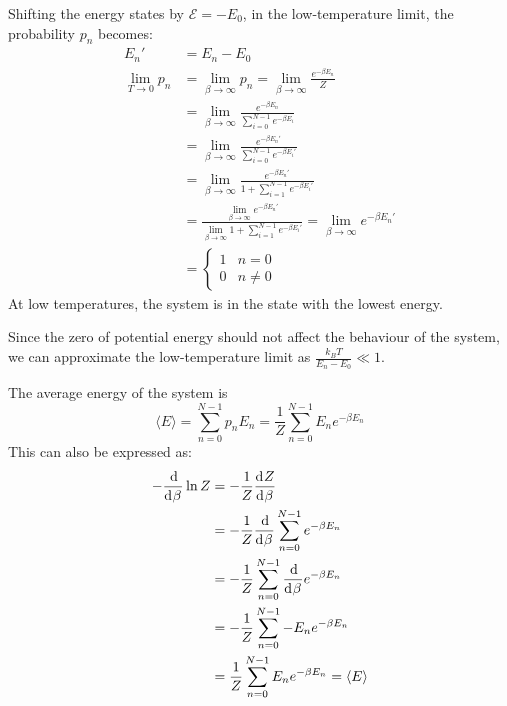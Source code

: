 \documentclass{article}
\begin{document}
Shifting the energy states by $\mathcal{E} = -E_0$, in the low-temperature limit, the probability $p_n$ becomes:
\begin{equation}
    \begin{split}
        E_n' & = E_n - E_0 \\
        \lim_{T\to 0} p_n & = \lim_{\beta\to\infty} p_n = \lim_{\beta\to\infty} \frac{ e^{-\beta E_n}}{Z} \\
        & = \lim_{\beta\to\infty} \frac{e^{-\beta E_n}}{\sum_{i=0}^{N-1} e^{-\beta E_i}} \\
        & = \lim_{\beta\to\infty} \frac{e^{-\beta E_n'}}{\sum_{i=0}^{N-1} e^{-\beta E_i'}} \\
        & = \lim_{\beta\to\infty} \frac{e^{-\beta E_n'}}{1 + \sum_{i=1}^{N-1} e^{-\beta E_i'}} \\
        & = \frac{\lim_{\beta\to\infty} e^{-\beta E_n'}}{\lim_{\beta\to\infty} 1 + \sum_{i=1}^{N-1} e^{-\beta E_i'}} = \lim_{\beta\to\infty} e^{-\beta E_n'} \\
        & = \begin{cases}
            1 & n = 0 \\
            0 & n \neq 0
        \end{cases}
    \end{split}
\end{equation}
At low temperatures, the system is in the state with the lowest energy.

\clearpage

\problem
Since the zero of potential energy should not affect the behaviour of the system, we can approximate the low-temperature limit as $\frac{k_B T}{E_n - E_0} \ll 1$.

\clearpage

\problem
The average energy of the system is
\begin{equation}
    \langle E \rangle = \sum_{n=0}^{N-1}p_n E_n = \frac{1}{Z}\sum_{n=0}^{N-1}E_n e^{-\beta E_n}
\end{equation}
This can also be expressed as:
\begin{equation}
    \begin{split}
        -\deriv[]{}{\beta} \ln{Z} & = -\frac{1}{Z}\deriv[]{Z}{\beta} \\
        & = -\frac{1}{Z}\deriv[]{}{\beta}\sum_{n=0}^{N-1} e^{-\beta E_n} \\
        & = -\frac{1}{Z}\sum_{n=0}^{N-1} \deriv[]{}{\beta} e^{-\beta E_n} \\
        & = -\frac{1}{Z}\sum_{n=0}^{N-1} -E_n e^{-\beta E_n} \\
        & = \frac{1}{Z}\sum_{n=0}^{N-1} E_n e^{-\beta E_n} = \langle E \rangle
    \end{split}
\end{equation}
\end{document}
